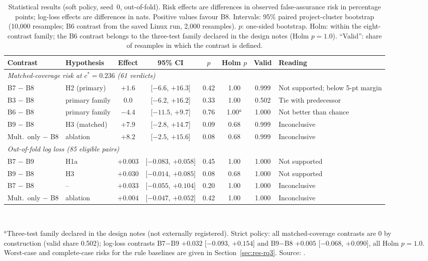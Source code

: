 \begin{table}[!t]
\caption{Statistical results (soft policy, seed~0, out-of-fold). Risk effects are differences in observed false-assurance risk in percentage points; log-loss effects are differences in nats. Positive values favour B8. Intervals: 95\% paired project-cluster bootstrap (10{,}000 resamples; B6 contrast from the saved Linux run, 2{,}000 resamples). $p$: one-sided bootstrap. Holm: within the eight-contrast family; the B6 contrast belongs to the three-test family declared in the design notes (Holm $p=1.0$). ``Valid'': share of resamples in which the contrast is defined.}
\label{tab:stats}
\centering
\footnotesize
\setlength{\tabcolsep}{4pt}
\begin{tabular}{|l|l|c|c|c|c|c|l|}
\hline
Contrast & Hypothesis & Effect & 95\% CI & $p$ & Holm $p$ & Valid & Reading \\
\hline
\multicolumn{8}{|l|}{\emph{Matched-coverage risk at $c^\ast=0.236$ (61 verdicts)}} \\
B7 $-$ B8 & H2 (primary) & $+1.6$ & [$-6.6$, $+16.3$] & 0.42 & 1.00 & 0.999 & Not supported; below 5-pt margin \\
B3 $-$ B8 & primary family & $0.0$ & [$-6.2$, $+16.2$] & 0.33 & 1.00 & 0.502 & Tie with predecessor \\
B6 $-$ B8 & primary family & $-4.4$ & [$-11.5$, $+9.7$] & 0.76 & 1.00$^{a}$ & 1.000 & Not better than chance \\
B9 $-$ B8 & H3 (matched) & $+7.9$ & [$-2.8$, $+14.7$] & 0.09 & 0.68 & 0.999 & Inconclusive \\
Mult.\ only $-$ B8 & ablation & $+8.2$ & [$-2.5$, $+15.6$] & 0.08 & 0.68 & 0.999 & Inconclusive \\
\hline
\multicolumn{8}{|l|}{\emph{Out-of-fold log loss (85 eligible pairs)}} \\
B7 $-$ B9 & H1a & $+0.003$ & [$-0.083$, $+0.058$] & 0.45 & 1.00 & 1.000 & Not supported \\
B9 $-$ B8 & H3 & $+0.030$ & [$-0.014$, $+0.085$] & 0.08 & 0.68 & 1.000 & Not supported \\
B7 $-$ B8 & -- & $+0.033$ & [$-0.055$, $+0.104$] & 0.20 & 1.00 & 1.000 & Inconclusive \\
Mult.\ only $-$ B8 & ablation & $+0.004$ & [$-0.047$, $+0.052$] & 0.42 & 1.00 & 1.000 & Inconclusive \\
\hline
\end{tabular}
\\[3pt]
\parbox{\textwidth}{\scriptsize $^{a}$Three-test family declared in the design notes (not externally registered). Strict policy: all matched-coverage contrasts are $0$ by construction (valid share 0.502); log-loss contrasts B7$-$B9 $+0.032$ [$-0.093$, $+0.154$] and B9$-$B8 $+0.005$ [$-0.068$, $+0.090$], all Holm $p=1.0$. Worst-case and complete-case risks for the rule baselines are given in Section~\ref{sec:res-rq3}. Source: .}
\end{table}
